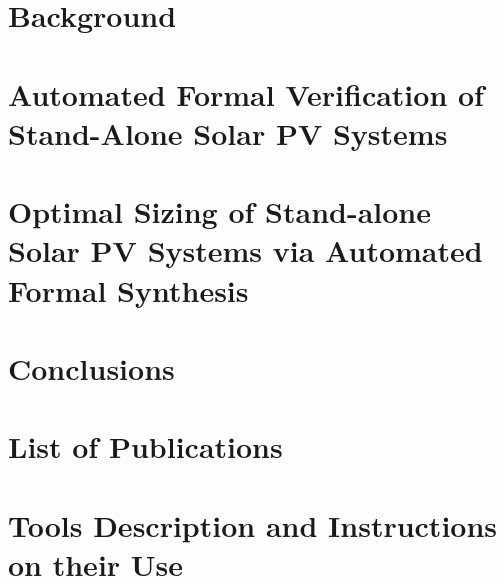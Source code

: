 \documentclass[12pt,twoside]{report}
\begin{document}
\chapter{Background}
\label{chap:background}


%
%
%

\chapter{Automated Formal Verification of Stand-Alone Solar PV Systems}
\label{chap:automatedverification}


\chapter{Optimal Sizing of Stand-alone Solar PV Systems via Automated Formal Synthesis}
\label{chap:automatedsynthesis}


\chapter{Conclusions}
\label{chap:conclusions}


\appendix
\chapter{List of Publications}
\label{chap:publications}

\chapter{Tools Description and Instructions on their Use}
\label{chap:tools}


\renewcommand\bibname{References}
%
{}
\end{document}
